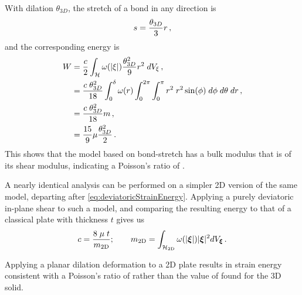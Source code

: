 With dilation $\theta_{3D}$, the stretch of a bond in any direction is
%
\begin{equation}
s = \frac{\theta_{3D}}{3} r\, ,\notag
\end{equation}
%
and the corresponding energy is 
%
\begin{align}
W &= \frac{c}{2}\int_\mathcal{H} \omega(|\xi|)\frac{\theta^2_{3D}}{9} r^2 \;dV_\xi\, ,\notag\\
&=\frac{c\;\theta^2_{3D}}{18} \int_0^\delta \omega(r)\int_0^{2\pi}\int_0^\pi r^2\;r^2 \sin(\phi)\;d\phi\;d\theta\;dr\, , \notag\\
&= \frac{c\;\theta^2_{3D}}{18} m\, , \notag\\
&= \frac{15}{9}\mu\frac{\theta^2_{3D}}{2}\, .
\end{align}
%
This shows that the model based on bond-stretch has a bulk modulus that is  of its shear modulus, indicating a Poisson's ratio of .

A nearly identical analysis can be performed on a simpler 2D version of the same model, departing after \cref{eq:deviatoricStrainEnergy}.
Applying a purely deviatoric in-plane shear to such a model, and comparing the resulting energy to that of a classical plate with thickness $t$ gives us
%
\begin{equation}
    c = \frac{8\;\mu\;t}{m_\textrm{2D}};\qquad m_\textrm{2D} =\int_\mathcal{H_\textrm{2D}}\omega(|\boldsymbol{\xi}|)|\boldsymbol{\xi}|^2 dV_{\boldsymbol{\xi}}\, .  \notag
\end{equation}
%

Applying a planar dilation deformation to a 2D plate results in strain energy consistent with a Poisson's ratio of  rather than the value of  found for the 3D solid.


